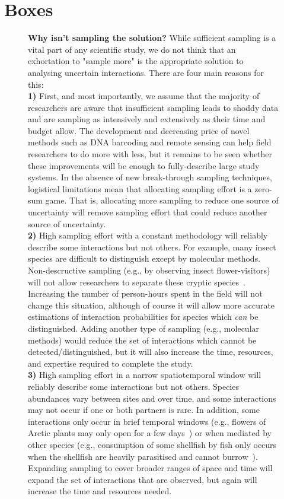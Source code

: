 \documentclass[12pt]{article}
\begin{document}

\section*{Boxes}

\begin{figure}[h!]
\caption{\textbf{Why isn't sampling the solution?}
While sufficient sampling is a vital part of any scientific study, we do not think that an exhortation to "sample more" is the appropriate solution to analysing uncertain interactions. There are four main reasons for this: \\
\textbf{1)} First, and most importantly, we assume that the majority of researchers are aware that insufficient sampling leads to shoddy data and are sampling as intensively and extensively as their time and budget allow. The development and decreasing price of novel methods such as DNA barcoding and remote sensing can help field researchers to do more with less, but it remains to be seen whether these improvements will be enough to fully-describe large study systems. In the absence of new break-through sampling techniques, logistical limitations mean that allocating sampling effort is a zero-sum game. That is, allocating more sampling to reduce one source of uncertainty will remove sampling effort that could reduce another source of uncertainty.\\
\textbf{2)} High sampling effort with a constant methodology will reliably describe some interactions but not others. For example, many insect species are difficult to distinguish except by molecular methods. Non-descructive sampling (e.g., by observing insect flower-visitors) will not allow researchers to separate these cryptic species~\citep{}. Increasing the number of person-hours spent in the field will not change this situation, although of course it will allow more accurate estimations of interaction probabilities for species which \emph{can} be distinguished. Adding another type of sampling (e.g., molecular methods) would reduce the set of interactions which cannot be detected/distinguished, but it will also increase the time, resources, and expertise required to complete the study. \\
\textbf{3)} High sampling effort in a narrow spatiotemporal window will reliably describe some interactions but not others. Species abundances vary between sites and over time, and some interactions may not occur if one or both partners is rare. In addition, some interactions only occur in brief temporal windows (e.g., flowers of Arctic plants may only open for a few days~\citep{}) or when mediated by other species (e.g., consumption of some shellfish by fish only occurs when the shellfish are heavily parasitised and cannot burrow~\citep{}). Expanding sampling to cover broader ranges of space and time will expand the set of interactions that are observed, but again will increase the time and resources needed. \\
}
\end{figure}
\end{document}
